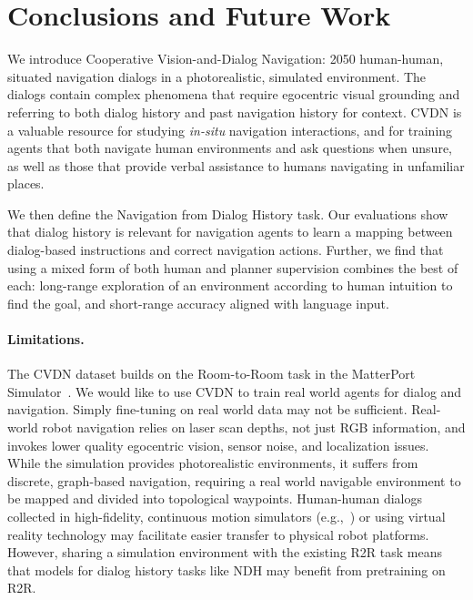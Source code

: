 \documentclass{article}
\newcommand{\datasetfull}{Cooperative Vision-and-Dialog Navigation}
\newcommand{\dataset}{CVDN}
\newcommand{\taskfull}{Navigation from Dialog History}
\newcommand{\task}{NDH}
\begin{document}
\section{Conclusions and Future Work}
\label{sec:conclusion}

We introduce \datasetfull{}: 2050 human-human, situated navigation dialogs in a photorealistic, simulated environment.
The dialogs contain complex phenomena that require egocentric visual grounding and referring to both dialog history and past navigation history for context.
\dataset{} is a valuable resource for studying \textit{in-situ} navigation interactions, and for training agents that both navigate human environments and ask questions when unsure, as well as those that provide verbal assistance to humans navigating in unfamiliar places.

We then define the \taskfull{} task.
Our evaluations show that dialog history is relevant for navigation agents to learn a mapping between dialog-based instructions and correct navigation actions.
Further, we find that using a mixed form of both human and planner supervision combines the best of each: long-range exploration of an environment according to human intuition to find the goal, and short-range accuracy aligned with language input.

\paragraph{Limitations.}
The \dataset{} dataset builds on the Room-to-Room task in the MatterPort Simulator~\cite{anderson:cvpr18}.
We would like to use \dataset{} to train real world agents for dialog and navigation.
Simply fine-tuning on real world data may not be sufficient.
Real-world robot navigation relies on laser scan depths, not just RGB information, and invokes lower quality egocentric vision, sensor noise, and localization issues.
While the simulation provides photorealistic environments, it suffers from discrete, graph-based navigation, requiring a real world navigable environment to be mapped and divided into topological waypoints.
Human-human dialogs collected in high-fidelity, continuous motion simulators (e.g.,~\cite{ai2thor}) or using virtual reality technology may facilitate easier transfer to physical robot platforms.
However, sharing a simulation environment with the existing R2R task means that models for dialog history tasks like \task{} may benefit from pretraining on R2R.
\end{document}
